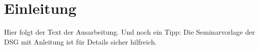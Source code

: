 %
\section{Einleitung}\label{sec:Einleitung}
%
Hier folgt der Text der Ausarbeitung. 
Und noch ein Tipp: Die Seminarvorlage der \acs{DSG} mit Anleitung ist für Details sicher hilfreich.
